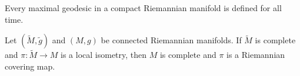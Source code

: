 \begin{corollary}
\label{cor:compact-implies-maximal-geodesics-defined}

Every maximal geodesic in a compact Riemannian manifold is defined for all
time.
\end{corollary}

\begin{theorem}
\label{thm:completeness-of-covering-map}





Let $(\widetilde M,\widetilde g)$ and $(M,g)$ be connected Riemannian
manifolds. If $\widetilde M$ is complete and
$\pi\colon\widetilde M\to M$ is a local isometry, then $M$ is complete and
$\pi$ is a Riemannian covering map.
\end{theorem}

